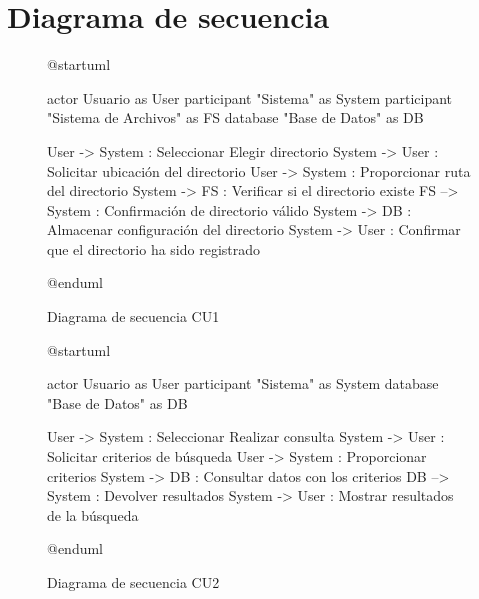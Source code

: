 
\section*{Diagrama de secuencia}

\begin{figure}[H]
	\centering
  \begin{plantuml}
    @startuml

    actor Usuario as User
    participant "Sistema" as System
    participant "Sistema de Archivos" as FS
    database "Base de Datos" as DB
    
    User -> System : Seleccionar Elegir directorio
    System -> User : Solicitar ubicación del directorio
    User -> System : Proporcionar ruta del directorio
    System -> FS : Verificar si el directorio existe
    FS --> System : Confirmación de directorio válido
    System -> DB : Almacenar configuración del directorio
    System -> User : Confirmar que el directorio ha sido registrado
    
    @enduml
  \end{plantuml}
	\caption{Diagrama de secuencia CU1}
\end{figure}

\begin{figure}[H]
	\centering
  \begin{plantuml}
    @startuml

    actor Usuario as User
    participant "Sistema" as System
    database "Base de Datos" as DB
    
    User -> System : Seleccionar Realizar consulta
    System -> User : Solicitar criterios de búsqueda
    User -> System : Proporcionar criterios
    System -> DB : Consultar datos con los criterios
    DB --> System : Devolver resultados
    System -> User : Mostrar resultados de la búsqueda
    
    @enduml
  \end{plantuml}
	\caption{Diagrama de secuencia CU2}
\end{figure}